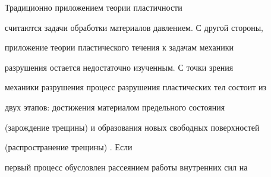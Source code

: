 
















\date{15/XI/2012}




\maketitle







 Традиционно приложением теории пластичности

считаются задачи обработки материалов давлением. С другой стороны,

приложение теории пластического течения к задачам механики

разрушения остается недостаточно изученным. С точки зрения

механики разрушения процесс разрушения пластических тел состоит из

двух этапов: достижения материалом предельного состояния

(зарождение трещины) и образования новых свободных поверхностей

(распространение трещины) \cite{bukh:bib:KhromBukhKozlStep}. Если

первый процесс обусловлен рассеянием работы внутренних сил на

